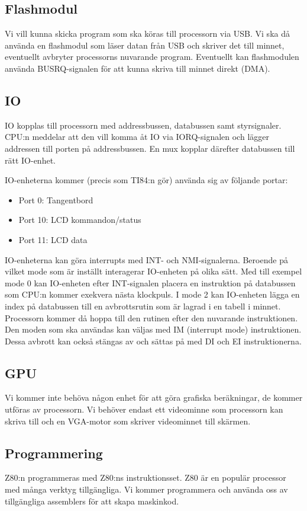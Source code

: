 \documentclass[12pt]{article}
\begin{document}
\subsection{Flashmodul}
Vi vill kunna skicka program som ska köras till processorn via USB. Vi ska då
använda en flashmodul som läser datan från USB och skriver det till minnet,
eventuellt avbryter processorns nuvarande program. Eventuellt kan flashmodulen
använda BUSRQ-signalen för att kunna skriva till minnet direkt (DMA).

\subsection{IO}
IO kopplas till processorn med addressbussen, databussen samt styrsignaler.
CPU:n meddelar att den vill komma åt IO via IORQ-signalen och lägger addressen
till porten på addressbussen. En mux kopplar därefter databussen till rätt
IO-enhet. 

IO-enheterna kommer (precis som TI84:n gör) använda sig av följande portar:
\begin{itemize}
    \item Port 0: Tangentbord
    \item Port 10: LCD kommandon/status
    \item Port 11: LCD data
\end{itemize}

IO-enheterna kan göra interrupts med INT- och NMI-signalerna. Beroende på
vilket mode som är inställt interagerar IO-enheten på olika sätt. Med till
exempel mode 0 kan IO-enheten efter INT-signalen placera en instruktion på
databussen som CPU:n kommer exekvera nästa klockpuls. I mode 2 kan IO-enheten
lägga en index på databussen till en avbrottsrutin som är lagrad i en tabell i
minnet. Processorn kommer då hoppa till den rutinen efter den nuvarande
instruktionen. Den moden som ska användas kan väljas med IM (interrupt mode)
instruktionen. Dessa avbrott kan också stängas av och sättas på med DI och EI
instruktionerna.

\subsection{GPU}
Vi kommer inte behöva någon enhet för att göra grafiska beräkningar, de kommer
utföras av processorn. Vi behöver endast ett videominne som processorn kan
skriva till och en VGA-motor som skriver videominnet till skärmen.

\subsection{Programmering}
Z80:n programmeras med Z80:ns instruktionsset. Z80 är en populär processor med
många verktyg tillgängliga. Vi kommer programmera och använda oss av
tillgängliga assemblers för att skapa maskinkod.
\end{document}
